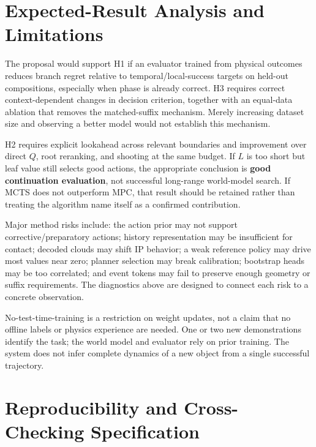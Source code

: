 \documentclass[
  10pt,
]{article}
\begin{document}
\hypertarget{phuxe2n-tuxedch-kux1ebft-quux1ea3-dux1ef1-kiux1ebfn-vuxe0-giux1edbi-hux1ea1n}{%
\section{Expected-Result Analysis and Limitations}\label{phuxe2n-tuxedch-kux1ebft-quux1ea3-dux1ef1-kiux1ebfn-vuxe0-giux1edbi-hux1ea1n}}

The proposal would support H1 if an evaluator trained from physical outcomes reduces branch regret relative to temporal/local-success targets on held-out compositions, especially when phase is already correct. H3 requires correct context-dependent changes in decision criterion, together with an equal-data ablation that removes the matched-suffix mechanism. Merely increasing dataset size and observing a better model would not establish this mechanism.

H2 requires explicit lookahead across relevant boundaries and improvement over direct \(Q\), root reranking, and shooting at the same budget. If \(L\) is too short but leaf value still selects good actions, the appropriate conclusion is \textbf{good continuation evaluation}, not successful long-range world-model search. If MCTS does not outperform MPC, that result should be retained rather than treating the algorithm name itself as a confirmed contribution.

Major method risks include: the action prior may not support corrective/preparatory actions; history representation may be insufficient for contact; decoded clouds may shift IP behavior; a weak reference policy may drive most values near zero; planner selection may break calibration; bootstrap heads may be too correlated; and event tokens may fail to preserve enough geometry or suffix requirements. The diagnostics above are designed to connect each risk to a concrete observation.

No-test-time-training is a restriction on weight updates, not a claim that no offline labels or physics experience are needed. One or two new demonstrations identify the task; the world model and evaluator rely on prior training. The system does not infer complete dynamics of a new object from a single successful trajectory.

\hypertarget{ux111ux1eb7c-tux1ea3-tuxe1i-lux1eadp-vuxe0-ux111ux1ed1i-chiux1ebfu}{%
\section{Reproducibility and Cross-Checking Specification}\label{ux111ux1eb7c-tux1ea3-tuxe1i-lux1eadp-vuxe0-ux111ux1ed1i-chiux1ebfu}}
\end{document}
